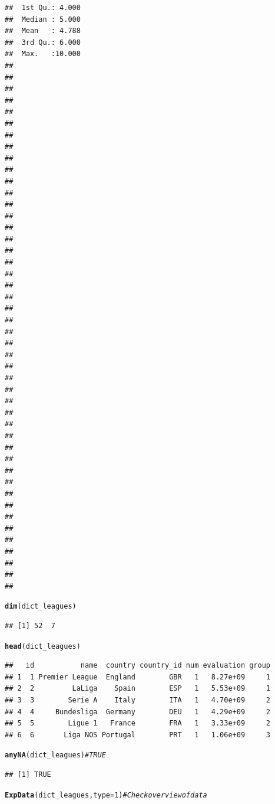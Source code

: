 \documentclass{article}\usepackage[]{graphicx}\usepackage[]{color}
\makeatletter
\newcommand{\hlnum}[1]{\textcolor[rgb]{0.686,0.059,0.569}{#1}}%
\newcommand{\hlcom}[1]{\textcolor[rgb]{0.678,0.584,0.686}{\textit{#1}}}%
\newcommand{\hlstd}[1]{\textcolor[rgb]{0.345,0.345,0.345}{#1}}%
\newcommand{\hlkwc}[1]{\textcolor[rgb]{0.333,0.667,0.333}{#1}}%
\newcommand{\hlkwd}[1]{\textcolor[rgb]{0.737,0.353,0.396}{\textbf{#1}}}%
\newenvironment{kframe}{%
 \def\at@end@of@kframe{}%
 \ifinner\ifhmode%
  \def\at@end@of@kframe{\end{minipage}}%
  \begin{minipage}{\columnwidth}%
 \fi\fi%
 \def\FrameCommand##1{\hskip\@totalleftmargin \hskip-\fboxsep
 \colorbox{shadecolor}{##1}\hskip-\fboxsep
     \hskip-\linewidth \hskip-\@totalleftmargin \hskip\columnwidth}%
 \MakeFramed {\advance\hsize-\width
   \@totalleftmargin\z@ \linewidth\hsize
   \@setminipage}}%
 {\par\unskip\endMakeFramed%
 \at@end@of@kframe}
\newenvironment{knitrout}{}{} %
\makeatother
\begin{document}
\begin{knitrout}
\begin{kframe}
\begin{verbatim}
##  1st Qu.: 4.000  
##  Median : 5.000  
##  Mean   : 4.788  
##  3rd Qu.: 6.000  
##  Max.   :10.000  
##                  
##                  
##                  
##                  
##                  
##                  
##                  
##                  
##                  
##                  
##                  
##                  
##                  
##                  
##                  
##                  
##                  
##                  
##                  
##                  
##                  
##                  
##                  
##                  
##                  
##                  
##                  
##                  
##                  
##                  
##                  
##                  
##                  
##                  
##                  
##                  
##                  
##                  
##                  
##                  
##                  
##                  
##                  
##                  
##                  
## 
\end{verbatim}
\begin{alltt}
\hlkwd{dim}\hlstd{(dict_leagues)}
\end{alltt}
\begin{verbatim}
## [1] 52  7
\end{verbatim}
\begin{alltt}
\hlkwd{head}\hlstd{(dict_leagues)}
\end{alltt}
\begin{verbatim}
##   id           name  country country_id num evaluation group
## 1  1 Premier League  England        GBR   1   8.27e+09     1
## 2  2         LaLiga    Spain        ESP   1   5.53e+09     1
## 3  3        Serie A    Italy        ITA   1   4.70e+09     2
## 4  4     Bundesliga  Germany        DEU   1   4.29e+09     2
## 5  5        Ligue 1   France        FRA   1   3.33e+09     2
## 6  6       Liga NOS Portugal        PRT   1   1.06e+09     3
\end{verbatim}
\begin{alltt}
\hlkwd{anyNA}\hlstd{(dict_leagues)} \hlcom{# TRUE}
\end{alltt}
\begin{verbatim}
## [1] TRUE
\end{verbatim}
\begin{alltt}
\hlkwd{ExpData}\hlstd{(dict_leagues,} \hlkwc{type}\hlstd{=}\hlnum{1}\hlstd{)} \hlcom{# Check overview of data}
\end{alltt}
\begin{verbatim}

\end{verbatim}
\end{kframe}
\end{knitrout}
\end{document}
